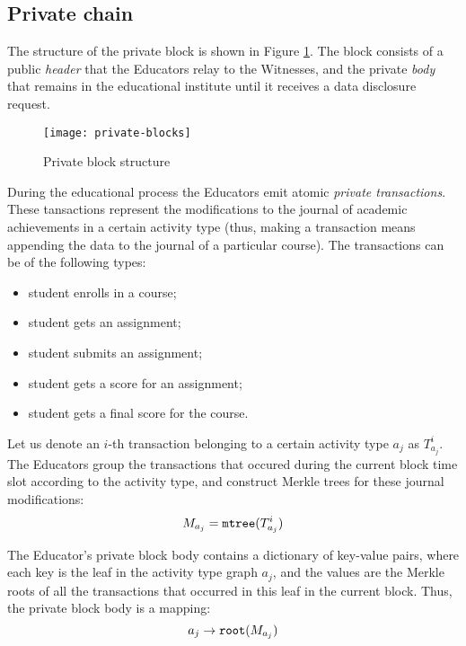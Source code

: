 \subsection{Private chain}

The structure of the private block is shown in Figure \ref{fig:privateblocks}. The block consists of a public \textit{header} that the Educators relay to the Witnesses, and the private \textit{body} that remains in the educational institute until it receives a data disclosure request.

\begin{figure}[ht]
\centering
\texttt{[image: private-blocks]}
\caption{Private block structure}
\label{fig:privateblocks}
\end{figure}

During the educational process the Educators emit atomic \textit{private transactions}. These tansactions represent the modifications to the journal of academic achievements in a certain activity type (thus, making a transaction means appending the data to the journal of a particular course). The transactions can be of the following types:
\begin{itemize}
\item student enrolls in a course;
\item student gets an assignment;
\item student submits an assignment;
\item student gets a score for an assignment;
\item student gets a final score for the course.
\end{itemize}

Let us denote an $i$-th transaction belonging to a certain activity type $a_j$ as $T_{a_j}^i$. The Educators group the transactions that occured during the current block time slot according to the activity type, and construct Merkle trees \cite{merkle1989certified} for these journal modifications:
\begin{equation}
M_{a_j} = \mathtt{mtree}(T_{a_j}^i)
\end{equation}

The Educator's private block body contains a dictionary of key-value pairs, where each key is the leaf in the activity type graph $a_j$, and the values are the Merkle roots of all the transactions that occurred in this leaf in the current block. Thus, the private block body is a mapping:
\begin{equation}
a_j \rightarrow \mathtt{root}(M_{a_j})
\end{equation}

